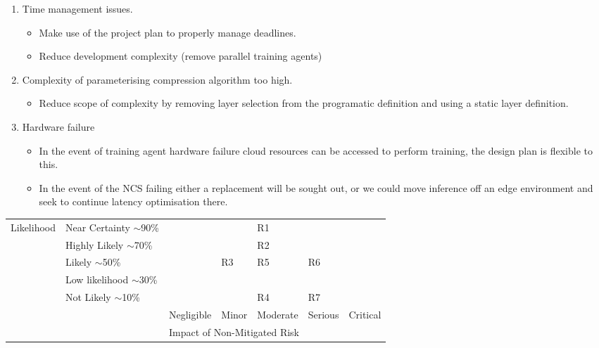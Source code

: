 \documentclass[../D1.tex]{subfiles}
\begin{document}
\begin{enumerate}[label={\textbf{R\theenumi}},leftmargin=*]
    \item Time management issues.
    \begin{itemize}
        \item Make use of the project plan to properly manage deadlines.
        \item Reduce development complexity (remove parallel training agents)
    \end{itemize}

    \item Complexity of parameterising compression algorithm too high.
    \begin{itemize}
        \item Reduce scope of complexity by removing layer selection from the programatic definition and using a static layer definition.
    \end{itemize}

    \item Hardware failure
    \begin{itemize}
        \item In the event of training agent hardware failure cloud resources can be accessed to perform training, the design plan is flexible to this.
        \item In the event of the NCS failing either a replacement will be sought out, or we could move inference off an edge environment and seek to continue latency optimisation there.
    \end{itemize}
\end{enumerate}


\begin{table}[H]
    \begin{tabular}{|l|l|l|l|l|l|l|}
    \hline
    \multirow{7}{*}{Likelihood} & Near Certainty $\sim$90\% &            &       & R1       &         &          \\ \cline{2-7} 
                                & Highly Likely $\sim$70\%  &            &       & R2       &         &          \\ \cline{2-7} 
                                & Likely $\sim$50\%         &            & R3    & R5       & R6      &          \\ \cline{2-7} 
                                & Low likelihood $\sim$30\% &            &       &          &         &          \\ \cline{2-7} 
                                & Not Likely $\sim$10\%     &            &       & R4       & R7      &          \\ \cline{2-7} 
                                & \multirow{2}{*}{}         & Negligible & Minor & Moderate & Serious & Critical \\ \cline{3-7} 
                                &                           & \multicolumn{5}{l|}{Impact of Non-Mitigated Risk}  \\ \hline
    \end{tabular}
    \end{table}
\end{document}
